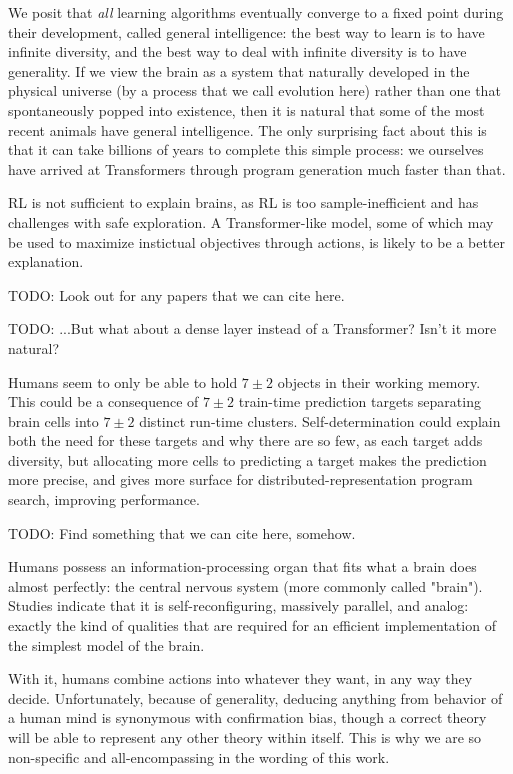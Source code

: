 \documentclass{article}
\begin{document}
We posit that \textit{all} learning algorithms eventually converge to a fixed point during their development, called general intelligence: the best way to learn is to have infinite diversity, and the best way to deal with infinite diversity is to have generality. If we view the brain as a system that naturally developed in the physical universe (by a process that we call evolution here) rather than one that spontaneously popped into existence, then it is natural that some of the most recent animals have general intelligence. The only surprising fact about this is that it can take billions of years to complete this simple process: we ourselves have arrived at Transformers through program generation much faster than that.

RL is not sufficient to explain brains, as RL is too sample-inefficient and has challenges with safe exploration. A Transformer-like model, some of which may be used to maximize instictual objectives through actions, is likely to be a better explanation.

    TODO: Look out for any papers that we can cite here.

    TODO: ...But what about a dense layer instead of a Transformer? Isn't it more natural?

Humans seem to only be able to hold $7\pm2$ objects in their working memory. This could be a consequence of $7\pm2$ train-time prediction targets separating brain cells into $7\pm2$ distinct run-time clusters. Self-determination could explain both the need for these targets and why there are so few, as each target adds diversity, but allocating more cells to predicting a target makes the prediction more precise, and gives more surface for distributed-representation program search, improving performance.

    TODO: Find something that we can cite here, somehow.

Humans possess an information-processing organ that fits what a brain does almost perfectly: the central nervous system (more commonly called "brain"). Studies indicate that it is self-reconfiguring, massively parallel, and analog: exactly the kind of qualities that are required for an efficient implementation of the simplest model of the brain.

With it, humans combine actions into whatever they want, in any way they decide. Unfortunately, because of generality, deducing anything from behavior of a human mind is synonymous with confirmation bias, though a correct theory will be able to represent any other theory within itself. This is why we are so non-specific and all-encompassing in the wording of this work.
\end{document}
